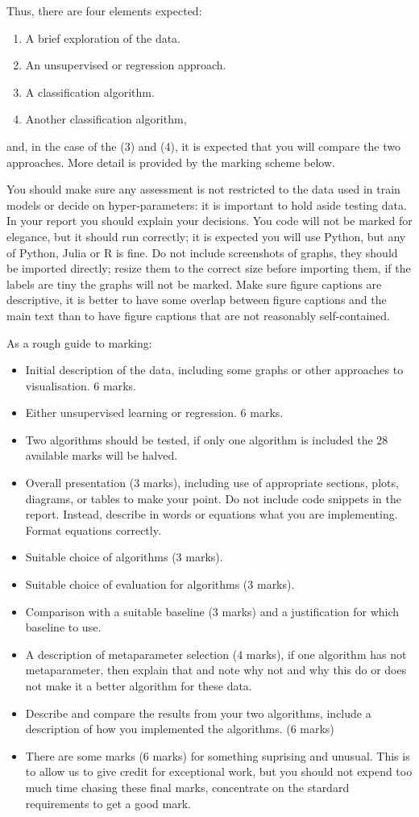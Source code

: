 \documentclass[12pt]{article}
\begin{document}
Thus, there are four elements expected:
\begin{enumerate}
\item A brief exploration of the data.
\item An unsupervised or regression approach.
\item A classification algorithm.
\item Another classification algorithm,
\end{enumerate}
and, in the case of the (3) and (4), it is expected that you will
compare the two approaches. More detail is provided by the marking
scheme below.

You should make sure any assessment is not restricted to the data used
in train models or decide on hyper-parameters: it is important to hold
aside testing data. In your report you should explain your
decisions. You code will not be marked for elegance, but it should run
correctly; it is expected you will use Python, but any of Python,
Julia or R is fine. Do not include screenshots of graphs, they should
be imported directly; resize them to the correct size before importing
them, if the labels are tiny the graphs will not be marked. Make sure
figure captions are descriptive, it is better to have some overlap
between figure captions and the main text than to have figure captions
that are not reasonably self-contained.

As a rough guide to marking:
\begin{itemize}
\item Initial description of the data, including some graphs or other approaches to visualisation. 6 marks.
\item Either unsupervised learning or regression. 6 marks.
\item Two algorithms should be tested, if only one algorithm is
  included the 28 available marks will be halved.
\item Overall presentation (3 marks), including use of appropriate
  sections, plots, diagrams, or tables to make your point. Do not
  include code snippets in the report. Instead, describe in words or
  equations what you are implementing. Format equations correctly.
\item Suitable choice of algorithms (3 marks).
\item Suitable choice of evaluation for algorithms (3 marks).
\item Comparison with a suitable baseline (3 marks) and a justification for which baseline to use.
\item A description of metaparameter selection (4 marks), if one
  algorithm has not metaparameter, then explain that and note why not
  and why this do or does not make it a better algorithm for these
  data.
\item Describe and compare the results from your two algorithms,
  include a description of how you implemented the algorithms. (6 marks)
\item There are some marks (6 marks) for something suprising and
  unusual. This is to allow us to give credit for exceptional work,
  but you should not expend too much time chasing these final marks,
  concentrate on the stardard requirements to get a good mark.
\end{itemize}
\end{document}
